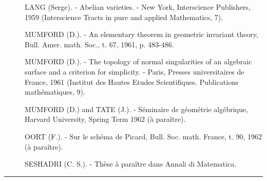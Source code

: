 \begin{description}
\item[{\normalfont[7]}] LANG (Serge). - Abelian varieties. - New York,
Interscience Publishers, 1959 (Interscience Tracts in pure and applied
Mathematics, 7).

\item[{\normalfont[8]}] MUMFORD (D.). - An elementary theorem in geometric invariant
theory, Bull. Amer. math. Soc., t. 67, 1961, p. 483-486.

\item[{\normalfont[9]}] MUMFORD (D.). - The topology of normal singularities of an
algebraic surface and a criterion for simplicity. - Paris, Presses
universitaires de France, 1961 (Institut des Hautes Etudes Scientifiques.
Publications mathématiques, 9).

\item[{\normalfont[10]}] MUMFORD (D.) and TATE (J.). - Séminaire de géométrie
algébrique, Harvard University, Spring Term 1962 (à paraître).

\item[{\normalfont[11]}] OORT (F.). - Sur le schéma de Picard,
Bull. Soc. math. France, t. 90, 1962 (à paraître).

\item[{\normalfont[12]}] SESHADRI (C. S.). - Thèse à paraître dans
Annali di Matematica.
\end{description}

\begin{center}
  \rule{.20\linewidth}{.3pt}
\end{center}
